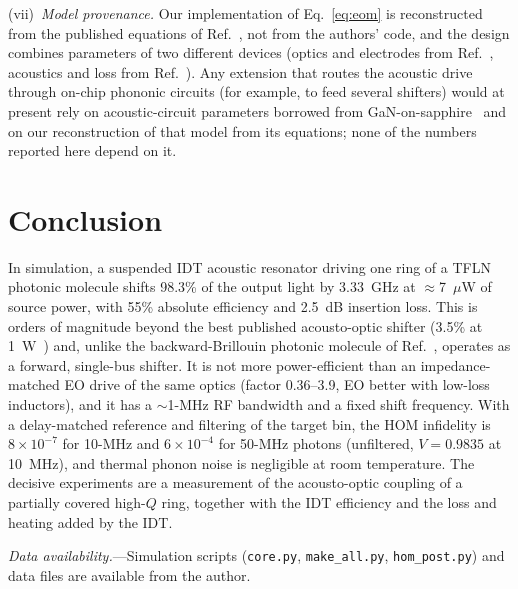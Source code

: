 \documentclass[aps,prapplied,reprint,superscriptaddress,amsmath,amssymb,floatfix]{revtex4-2}
\begin{document}
(vii)~\emph{Model provenance.} Our implementation of Eq.~\eqref{eq:eom} is reconstructed from the published equations of Ref.~\cite{Hu2021}, not from the authors' code, and the design combines parameters of two different devices (optics and electrodes from Ref.~\cite{Hu2021}, acoustics and loss from Ref.~\cite{Shao2019}). Any extension that routes the acoustic drive through on-chip phononic circuits (for example, to feed several shifters) would at present rely on acoustic-circuit parameters borrowed from GaN-on-sapphire~\cite{Xu2025} and on our reconstruction of that model from its equations; none of the numbers reported here depend on it.

\section{Conclusion}
In simulation, a suspended IDT acoustic resonator driving one ring of a TFLN photonic molecule shifts 98.3\% of the output light by 3.33~GHz at $\approx$7~$\mu$W of source power, with 55\% absolute efficiency and 2.5~dB insertion loss. This is orders of magnitude beyond the best published acousto-optic shifter (3.5\% at 1~W~\cite{Shao2020}) and, unlike the backward-Brillouin photonic molecule of Ref.~\cite{Zhu2025ao}, operates as a forward, single-bus shifter. It is not more power-efficient than an impedance-matched EO drive of the same optics (factor 0.36--3.9, EO better with low-loss inductors), and it has a $\sim$1-MHz RF bandwidth and a fixed shift frequency. With a delay-matched reference and filtering of the target bin, the HOM infidelity is $8\times10^{-7}$ for 10-MHz and $6\times10^{-4}$ for 50-MHz photons (unfiltered, $V=0.9835$ at 10~MHz), and thermal phonon noise is negligible at room temperature. The decisive experiments are a measurement of the acousto-optic coupling of a partially covered high-$Q$ ring, together with the IDT efficiency and the loss and heating added by the IDT.

\emph{Data availability.}---Simulation scripts (\texttt{core.py}, \texttt{make\_all.py}, \texttt{hom\_post.py}) and data files are available from the author.


\end{document}
